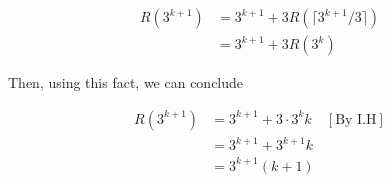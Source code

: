\documentclass[12pt]{article}
\begin{document}
\begin{enumerate}[a.]
\begin{mdframed}
        \begin{align}
            R(3^{k+1}) &= 3^{k+1} + 3R(\lceil 3^{k+1}/3 \rceil)\\
            &= 3^{k+1} + 3R(3^k)
        \end{align}

        \bigskip

        Then, using this fact, we can conclude

        \begin{align}
            R(3^{k+1}) &= 3^{k+1} + 3 \cdot 3^kk & [\text{By I.H}]\\
            &= 3^{k+1} + 3^{k+1}k\\
            &= 3^{k+1}(k + 1)
        \end{align}
    \end{mdframed}
















\end{enumerate}
\end{document}
